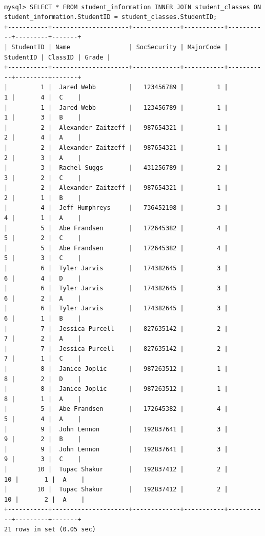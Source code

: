 \begin{lstlisting}

mysql> SELECT * FROM student_information INNER JOIN student_classes ON student_information.StudentID = student_classes.StudentID;
+-----------+---------------------+-------------+-----------+-----------+---------+-------+
| StudentID | Name                | SocSecurity | MajorCode | StudentID | ClassID | Grade |
+-----------+---------------------+-------------+-----------+-----------+---------+-------+
|         1 |  Jared Webb         |   123456789 |         1 |         1 |       4 |  C    |
|         1 |  Jared Webb         |   123456789 |         1 |         1 |       3 |  B    |
|         2 |  Alexander Zaitzeff |   987654321 |         1 |         2 |       4 |  A    |
|         2 |  Alexander Zaitzeff |   987654321 |         1 |         2 |       3 |  A    |
|         3 |  Rachel Suggs       |   431256789 |         2 |         3 |       2 |  C    |
|         2 |  Alexander Zaitzeff |   987654321 |         1 |         2 |       1 |  B    |
|         4 |  Jeff Humphreys     |   736452198 |         3 |         4 |       1 |  A    |
|         5 |  Abe Frandsen       |   172645382 |         4 |         5 |       2 |  C    |
|         5 |  Abe Frandsen       |   172645382 |         4 |         5 |       3 |  C    |
|         6 |  Tyler Jarvis       |   174382645 |         3 |         6 |       4 |  D    |
|         6 |  Tyler Jarvis       |   174382645 |         3 |         6 |       2 |  A    |
|         6 |  Tyler Jarvis       |   174382645 |         3 |         6 |       1 |  B    |
|         7 |  Jessica Purcell    |   827635142 |         2 |         7 |       2 |  A    |
|         7 |  Jessica Purcell    |   827635142 |         2 |         7 |       1 |  C    |
|         8 |  Janice Joplic      |   987263512 |         1 |         8 |       2 |  D    |
|         8 |  Janice Joplic      |   987263512 |         1 |         8 |       1 |  A    |
|         5 |  Abe Frandsen       |   172645382 |         4 |         5 |       4 |  A    |
|         9 |  John Lennon        |   192837641 |         3 |         9 |       2 |  B    |
|         9 |  John Lennon        |   192837641 |         3 |         9 |       3 |  C    |
|        10 |  Tupac Shakur       |   192837412 |         2 |        10 |       1 |  A    |
|        10 |  Tupac Shakur       |   192837412 |         2 |        10 |       2 |  A    |
+-----------+---------------------+-------------+-----------+-----------+---------+-------+
21 rows in set (0.05 sec)

\end{lstlisting}

